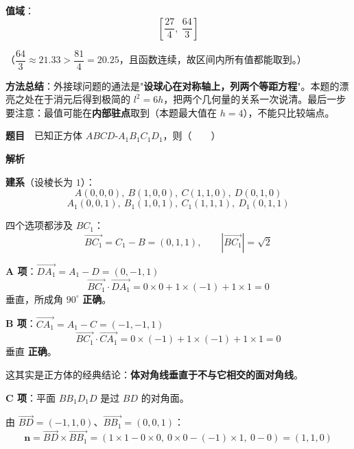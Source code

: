 \textbf{值域}：
\[\left[\frac{27}4,\ \frac{64}3\right]\]

（$\dfrac{64}3\approx21.33>\dfrac{81}4=20.25$，且函数连续，故区间内所有值都能取到。）


\begin{gktip}
\textbf{方法总结}：外接球问题的通法是"\textbf{设球心在对称轴上，列两个等距方程}"。本题的漂亮之处在于消元后得到极简的 $l^2=6h$，把两个几何量的关系一次说清。最后一步要注意：最值可能在\textbf{内部驻点}取到（本题最大值在 $h=4$），不能只比较端点。
\end{gktip}

\par\medskip



\textbf{题目}　已知正方体 $ABCD\text{-}A_1B_1C_1D_1$，则（　　）

\textbf{解析}

\textbf{建系}（设棱长为 $1$）：
\[A(0,0,0),\ B(1,0,0),\ C(1,1,0),\ D(0,1,0)\]
\[A_1(0,0,1),\ B_1(1,0,1),\ C_1(1,1,1),\ D_1(0,1,1)\]

四个选项都涉及 $BC_1$：
\[\overrightarrow{BC_1}=C_1-B=(0,1,1),\qquad \left|\overrightarrow{BC_1}\right|=\sqrt2\]

\par\medskip

\textbf{A 项}：$\overrightarrow{DA_1}=A_1-D=(0,-1,1)$
\[\overrightarrow{BC_1}\cdot\overrightarrow{DA_1}=0\times0+1\times(-1)+1\times1=0\]
垂直，所成角 $90^\circ$  \textbf{正确}。

\par\medskip

\textbf{B 项}：$\overrightarrow{CA_1}=A_1-C=(-1,-1,1)$
\[\overrightarrow{BC_1}\cdot\overrightarrow{CA_1}=0\times(-1)+1\times(-1)+1\times1=0\]
垂直  \textbf{正确}。

\begin{gktip}
这其实是正方体的经典结论：\textbf{体对角线垂直于不与它相交的面对角线}。
\end{gktip}

\par\medskip

\textbf{C 项}：平面 $BB_1D_1D$ 是过 $BD$ 的对角面。

由 $\overrightarrow{BD}=(-1,1,0)$、$\overrightarrow{BB_1}=(0,0,1)$：
\[\boldsymbol n=\overrightarrow{BD}\times\overrightarrow{BB_1}=(1\times1-0\times0,\ 0\times0-(-1)\times1,\ 0-0)=(1,1,0)\]

